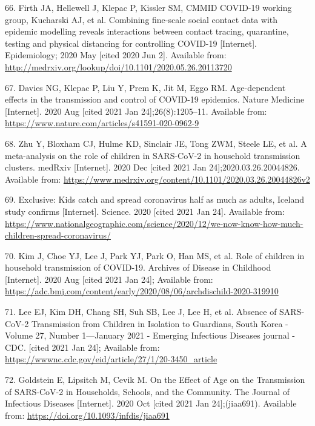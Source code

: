 \documentclass[
]{article}
\begin{document}
\leavevmode\hypertarget{ref-firth_combining_2020}{}%
66. Firth JA, Hellewell J, Klepac P, Kissler SM, CMMID COVID-19 working
group, Kucharski AJ, et al. Combining fine-scale social contact data
with epidemic modelling reveals interactions between contact tracing,
quarantine, testing and physical distancing for controlling COVID-19
{[}Internet{]}. Epidemiology; 2020 May {[}cited 2020 Jun 2{]}. Available
from: \url{http://medrxiv.org/lookup/doi/10.1101/2020.05.26.20113720}

\leavevmode\hypertarget{ref-davies_age-dependent_2020}{}%
67. Davies NG, Klepac P, Liu Y, Prem K, Jit M, Eggo RM. Age-dependent
effects in the transmission and control of COVID-19 epidemics. Nature
Medicine {[}Internet{]}. 2020 Aug {[}cited 2021 Jan
24{]};26(8):1205--11. Available from:
\url{https://www.nature.com/articles/s41591-020-0962-9}

\leavevmode\hypertarget{ref-zhu_meta-analysis_2020}{}%
68. Zhu Y, Bloxham CJ, Hulme KD, Sinclair JE, Tong ZWM, Steele LE, et
al. A meta-analysis on the role of children in SARS-CoV-2 in household
transmission clusters. medRxiv {[}Internet{]}. 2020 Dec {[}cited 2021
Jan 24{]};2020.03.26.20044826. Available from:
\url{https://www.medrxiv.org/content/10.1101/2020.03.26.20044826v2}

\leavevmode\hypertarget{ref-noauthor_exclusive_2020}{}%
69. Exclusive: Kids catch and spread coronavirus half as much as adults,
Iceland study confirms {[}Internet{]}. Science. 2020 {[}cited 2021 Jan
24{]}. Available from:
\url{https://www.nationalgeographic.com/science/2020/12/we-now-know-how-much-children-spread-coronavirus/}

\leavevmode\hypertarget{ref-kim_role_2020}{}%
70. Kim J, Choe YJ, Lee J, Park YJ, Park O, Han MS, et al. Role of
children in household transmission of COVID-19. Archives of Disease in
Childhood {[}Internet{]}. 2020 Aug {[}cited 2021 Jan 24{]}; Available
from:
\url{https://adc.bmj.com/content/early/2020/08/06/archdischild-2020-319910}

\leavevmode\hypertarget{ref-lee_absence_nodate}{}%
71. Lee EJ, Kim DH, Chang SH, Suh SB, Lee J, Lee H, et al. Absence of
SARS-CoV-2 Transmission from Children in Isolation to Guardians, South
Korea - Volume 27, Number 1---January 2021 - Emerging Infectious
Diseases journal - CDC. {[}cited 2021 Jan 24{]}; Available from:
\url{https://wwwnc.cdc.gov/eid/article/27/1/20-3450_article}

\leavevmode\hypertarget{ref-goldstein_effect_2020}{}%
72. Goldstein E, Lipsitch M, Cevik M. On the Effect of Age on the
Transmission of SARS-CoV-2 in Households, Schools, and the Community.
The Journal of Infectious Diseases {[}Internet{]}. 2020 Oct {[}cited
2021 Jan 24{]};(jiaa691). Available from:
\url{https://doi.org/10.1093/infdis/jiaa691}
\end{document}

